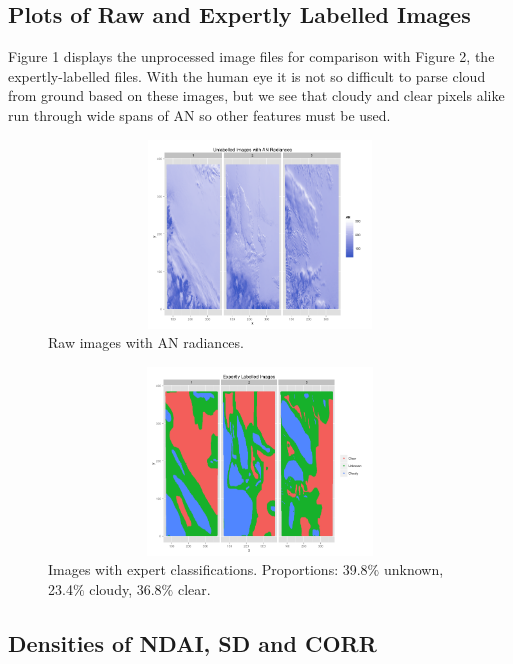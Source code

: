\documentclass{article}\usepackage[]{graphicx}\usepackage[]{color}
\begin{document}
\subsection{Plots of Raw and Expertly Labelled Images}
Figure 1 displays the unprocessed image files for comparison with Figure 2, the expertly-labelled files. With the human eye it is not so difficult to parse cloud from ground based on these images, but we see that cloudy and clear pixels alike run through wide spans of AN so other features must be used.
\begin{figure}[h]
\includegraphics[width = 18cm, height=5cm]{RAWEDA.png}
\caption{Raw images with AN radiances.}
\end{figure}

\begin{figure}[h]
\includegraphics[width = 18cm, height=5cm]{EXPERTSEDA.png}
\caption{Images with expert classifications. Proportions: 39.8$\%$ unknown, 23.4$\%$ cloudy, 36.8$\%$ clear.}
\end{figure}
\subsection{Densities of NDAI, SD and CORR}
\end{document}
